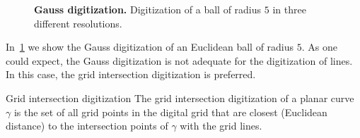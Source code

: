 \begin{figure}
{}
\caption{\textbf{Gauss digitization.} Digitization of a ball of radius $5$ in three different resolutions.}
\label{ch4:fig:gauss-digitization}
\end{figure}

In~\cref{ch4:fig:gauss-digitization} we show the Gauss digitization of an Euclidean ball of radius $5$. As one could expect, the Gauss digitization is not adequate for the digitization of lines. In this case, the grid intersection digitization is preferred.

\begin{definition}{Grid intersection digitization}
The grid intersection digitization of a planar curve $\gamma$ is the set of all grid points in the digital grid that are closest (Euclidean distance) to the intersection points of $\gamma$ with the grid lines.
\end{definition}

